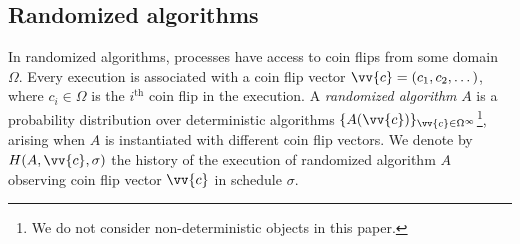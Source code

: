 



\subsection{Randomized algorithms}
\label{ivl-ssec:rand-objects}


In randomized algorithms, processes have access to coin flips from some domain $\Omega$.
Every execution is associated with a coin flip vector $\vv{c}=(c_1, c_2, \dots)$,
where $c_i \in \Omega$ is the $i^\text{th}$ coin flip in the execution.
A \emph{randomized algorithm} $A$ is a probability distribution over deterministic
algorithms $\{A({\vv{c})}\}_{{\vv{c}} \in \Omega^{\infty}}$\footnote{We do not consider non-deterministic objects in this paper.},
arising when $A$ is instantiated with different coin flip vectors.
We denote by $H(A, {\vv{c}}, \sigma)$ the history of the execution of randomized algorithm
$A$ observing coin flip vector $\vv{c}$ in schedule $\sigma$.

